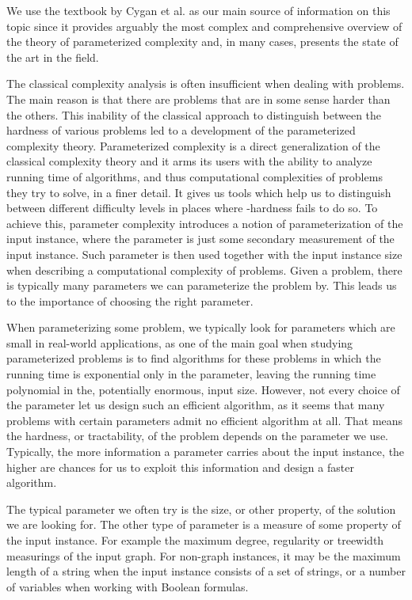 We use the textbook by Cygan et al. \cite{Cygan2015} as our main source of information on this topic since it
provides arguably the most complex and comprehensive overview of the theory of parameterized complexity and,
in many cases, presents the state of the art in the field.

The classical complexity analysis is often insufficient when dealing with \NPh problems.
The main reason is that there are \NPh problems that are in some sense harder than the others.
This inability of the classical approach to distinguish between the hardness of various \NPh problems
led to a development of the parameterized complexity theory.
Parameterized complexity is a direct generalization of the classical complexity theory and it arms its users
with the ability to analyze running time of algorithms, and thus computational complexities of problems
they try to solve, in a finer detail.
It gives us tools which help us to distinguish between different difficulty levels in places where
\NP-hardness fails to do so.
To achieve this, parameter complexity introduces a notion of parameterization of the input instance, where
the parameter is just some secondary measurement of the input instance.
Such parameter is then used together with the input instance size when describing a computational complexity of \NPh problems.
Given a problem, there is typically many parameters we can parameterize the problem by.
This leads us to the importance of choosing the right parameter.

When parameterizing some problem, we typically look for parameters which are small in real-world applications,
as one of the main goal when studying parameterized problems is to find algorithms for these problems in which
the running time is exponential only in the parameter, leaving the running time polynomial in the, potentially enormous, input size.
However, not every choice of the parameter let us design such an efficient algorithm, as it seems that many problems with
certain parameters admit no efficient algorithm at all.
That means the hardness, or tractability, of the problem depends on the parameter we use.
Typically, the more information a parameter carries about the input instance, the higher are chances for us to exploit this
information and design a faster algorithm.

The typical parameter we often try is the size, or other property, of the solution we are looking for.
The other type of parameter is a measure of some property of the input instance.
For example the maximum degree, regularity or treewidth measurings of the input graph.
For non-graph instances, it may be the maximum length of a string when the input instance consists of a set of strings,
or a number of variables when working with Boolean formulas.


